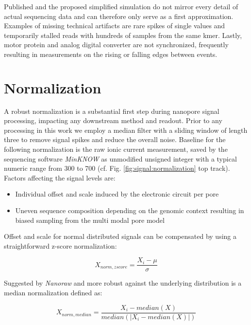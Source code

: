 Published and the proposed simplified simulation do not mirror every detail of actual sequencing data and can therefore only serve as a first approximation. Examples of missing technical artifacts are rare spikes of single values and temporarily stalled reads with hundreds of samples from the same kmer. Lastly, motor protein and analog digital converter are not synchronized, frequently resulting in measurements on the rising or falling edges between events.




\section{Normalization}
\label{sec:signal:normalization}

A robust normalization is a substantial first step during nanopore signal processing, impacting any downstream method and readout. Prior to any processing in this work we employ a median filter with a sliding window of length three to remove signal spikes and reduce the overall noise. Baseline for the following normalization is the raw ionic current measurement, saved by the sequencing software \textit{MinKNOW} as unmodified unsigned integer with a typical numeric range from 300 to 700 (cf. Fig. \ref{fig:signal:normalization} top track). Factors affecting the signal levels are:

\begin{itemize}
	\item Individual offset and scale induced by the electronic circuit per pore
	\item Uneven sequence composition depending on the genomic context resulting in biased sampling from the multi modal pore model
\end{itemize}

Offset and scale for normal distributed signals can be compensated by using a straightforward z-score normalization:

\begin{equation}
	X_{norm,zscore} = \frac{X_{i} - \mu}{\sigma}
\end{equation}

Suggested by \textit{Nanoraw} \cite{Stoiber2017} and more robust against the underlying distribution is a median normalization defined as:

\begin{equation}
	X_{norm,median} = \frac{X_{i} - median(X)}{median(\left|X_{i}-median(X)\right|)}
\end{equation}

